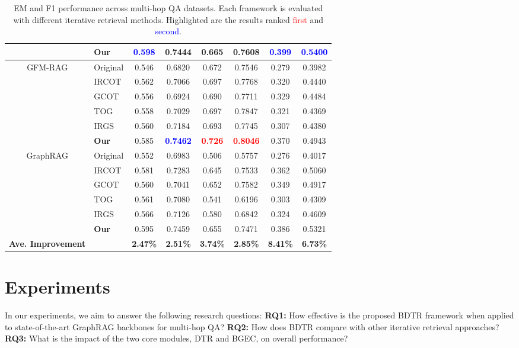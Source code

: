 \documentclass{article} %
\begin{document}
\begin{table}[t]
\begin{tabular}{clcccccc}
    & \textbf{Our} & \textcolor{blue}{\textbf{0.598}} & 0.7444 & 0.665 & 0.7608 & \textcolor{blue}{\textbf{0.399}} & \textcolor{blue}{\textbf{0.5400}} \\
\midrule
\multirow{6}{*}{GFM-RAG} 
& Original & 0.546 & 0.6820 & 0.672 & 0.7546 & 0.279 & 0.3982 \\
& IRCOT    & 0.562 & 0.7066 & 0.697 & 0.7768 & 0.320 & 0.4440 \\
& GCOT     & 0.556 & 0.6924 & 0.690 & 0.7711 & 0.329 & 0.4484 \\
& TOG      & 0.558 & 0.7029 & 0.697 & 0.7847 & 0.321 & 0.4369 \\
& IRGS     & 0.560 & 0.7184 & 0.693 & 0.7745 & 0.307 & 0.4380 \\
& \textbf{Our} & 0.585 & \textcolor{blue}{\textbf{0.7462}} & \textcolor{red}{\textbf{0.726}} & \textcolor{red}{\textbf{0.8046}} & 0.370 & 0.4943 \\
\midrule
\multirow{6}{*}{GraphRAG} 
& Original & 0.552 & 0.6983 & 0.506 & 0.5757 & 0.276 & 0.4017 \\
& IRCOT    & 0.581 & 0.7283 & 0.645 & 0.7533 & 0.362 & 0.5060 \\
& GCOT     & 0.560 & 0.7041 & 0.652 & 0.7582 & 0.349 & 0.4917 \\
& TOG      & 0.561 & 0.7080 & 0.541 & 0.6196 & 0.303 & 0.4309 \\
& IRGS     & 0.566 & 0.7126 & 0.580 & 0.6842 & 0.324 & 0.4609 \\
& \textbf{Our} & 0.595 & 0.7459 & 0.655 & 0.7471 & 0.386 & 0.5321 \\
\midrule
\textbf{Ave. Improvement} & & \textbf{2.47\%} & \textbf{2.51\%} & \textbf{3.74\%} & \textbf{2.85\%} & \textbf{8.41\%} & \textbf{6.73\%} \\
\bottomrule
\end{tabular}
\caption{EM and F1 performance across multi-hop QA datasets. Each framework is evaluated with different iterative retrieval methods. Highlighted are the results ranked \textcolor{red}{first} and \textcolor{blue}{second}.}
\label{tab:main_results}
\end{table}













\section{Experiments}
In our experiments, we aim to answer the following research questions:  
\textbf{RQ1:} How effective is the proposed BDTR framework when applied to state-of-the-art GraphRAG backbones for multi-hop QA?  
\textbf{RQ2:} How does BDTR compare with other iterative retrieval approaches?  
\textbf{RQ3:} What is the impact of the two core modules, DTR and BGEC, on overall performance?
\end{document}
